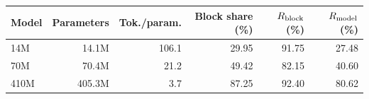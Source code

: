 \begin{tabular}{lrrrrr}
\toprule
Model & Parameters & Tok./param. & Block share (\%) & $R_{\mathrm{block}}$ (\%) & $R_{\mathrm{model}}$ (\%) \\
\midrule
14M & 14.1M & 106.1 & 29.95 & 91.75 & 27.48 \\
70M & 70.4M & 21.2 & 49.42 & 82.15 & 40.60 \\
410M & 405.3M & 3.7 & 87.25 & 92.40 & 80.62 \\
\bottomrule
\end{tabular}
